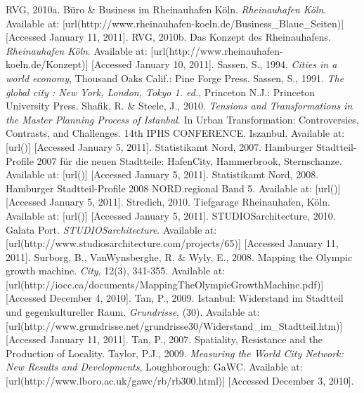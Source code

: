 {\nl%
RVG, 2010a. Büro \& Business im Rheinauhafen Köln. {\em Rheinauhafen Köln}. Available at:  [url(http://www.rheinauhafen-koeln.de/Business_Blaue_Seiten)] [Accessed January 11, 2011].%
\nl%
RVG, 2010b. Das Konzept des Rheinauhafens. {\em Rheinauhafen Köln}. Available at:  [url(http://www.rheinauhafen-koeln.de/Konzept)] [Accessed January 10, 2011].%
\nl%
Sassen, S., 1994. {\em Cities in a world economy}, Thousand Oaks  Calif.: Pine Forge Press.%
\nl%
Sassen, S., 1991. {\em The global city : New York, London, Tokyo 1. ed.}, Princeton  N.J.: Princeton University Press.%
\nl%
Shafik, R. \& Steele, J., 2010. {\em Tensions and Transformations in the Master Planning Process of Istanbul}. In Urban Transformation: Controversies, Contrasts, and Challenges. 14th IPHS CONFERENCE.  Iszanbul. Available at: \goto{\hyphenatedurl{}} [url()] [Accessed January 5, 2011].%
\nl%
Statistikamt Nord, 2007. Hamburger Stadtteil-Profile 2007 für die neuen Stadtteile: HafenCity, Hammerbrook, Sternschanze. Available at: \goto{\hyphenatedurl{}} [url()] [Accessed January 5, 2011].%
\nl%
Statistikamt Nord, 2008. Hamburger Stadtteil-Profile 2008 NORD.regional Band 5. Available at: \goto{\hyphenatedurl{}} [url()] [Accessed January 5, 2011].%
\nl%
Stredich, 2010. Tiefgarage Rheinauhafen, Köln. Available at: \goto{\hyphenatedurl{}} [url()] [Accessed January 5, 2011].%
\nl%
STUDIOSarchitecture, 2010. Galata Port. {\em STUDIOSarchitecture}. Available at:  [url(http://www.studiosarchitecture.com/projects/65)] [Accessed January 11, 2011].%
\nl%
Surborg, B., VanWynsberghe, R. \& Wyly, E., 2008. Mapping the Olympic growth machine. {\em City}, 12(3), 341-355. Available at:  [url(http://iocc.ca/documents/MappingTheOlympicGrowthMachine.pdf)] [Accessed December 4, 2010]. \nl%
Tan, P., 2009. Istanbul: Widerstand im Stadtteil und gegenkultureller Raum. {\em Grundrisse}, (30). Available at:  [url(http://www.grundrisse.net/grundrisse30/Widerstand_im_Stadtteil.htm)] [Accessed January 11, 2011].%
\nl%
Tan, P., 2007. Spatiality, Resistance and the Production of Locality.%
\nl%
Taylor, P.J., 2009. {\em Measuring the World City Network: New Results and Developments}, Loughborough: GaWC. Available at:  [url(http://www.lboro.ac.uk/gawc/rb/rb300.html)] [Accessed December 3, 2010].%
\nl%
\stopREF%
}

